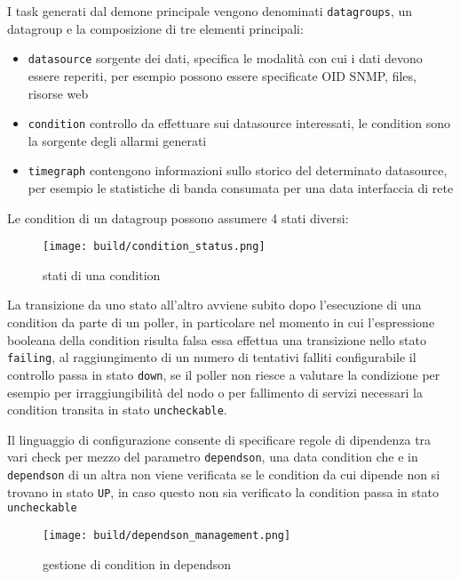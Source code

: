 \documentclass[12pt,a4paper,twoside,openright]{book}
\begin{document}
I task generati dal demone principale vengono denominati \verb|datagroups|, un datagroup e la composizione di tre elementi principali:

\begin{itemize}
  \item \verb|datasource| sorgente dei dati, specifica le modalità con cui i dati devono essere reperiti, per esempio possono essere specificate OID SNMP, files, risorse web
  \item \verb|condition| controllo da effettuare sui datasource interessati, le condition sono la sorgente degli allarmi generati
  \item \verb|timegraph| contengono informazioni sullo storico del determinato datasource, per esempio le statistiche di banda consumata per una data interfaccia di rete
\end{itemize}

Le condition di un datagroup possono assumere 4 stati diversi:

\begin{figure}[H]
    \centering
    \texttt{[image: build/condition\_status.png]}
    \caption{stati di una condition}
    \label{fig:enter-label}
\end{figure}

La transizione da uno stato all'altro avviene subito dopo l'esecuzione di una condition da parte di un poller, in particolare nel momento in cui l'espressione booleana della condition risulta falsa essa effettua una transizione nello stato \verb|failing|, al raggiungimento di un numero di tentativi falliti configurabile il controllo passa in stato \verb|down|, se il poller non riesce a valutare la condizione per esempio per irraggiungibilità del nodo o per fallimento di servizi necessari la condition transita in stato \verb|uncheckable|.

Il linguaggio di configurazione consente di specificare regole di dipendenza tra vari check per mezzo del parametro \verb|dependson|, una data condition che e in \verb|dependson| di un altra non viene verificata se le condition da cui dipende non si trovano in stato \verb|UP|, in caso questo non sia verificato la condition passa in stato \verb|uncheckable|

\begin{figure}[H]
    \centering
    \texttt{[image: build/dependson\_management.png]}
    \caption{gestione di condition in dependson}
    \label{fig:enter-label}
\end{figure}
\end{document}
